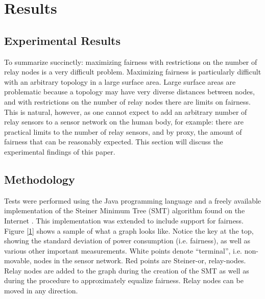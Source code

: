 \section{Results}

\subsection{Experimental Results}

To summarize succinctly: maximizing fairness with restrictions on the number of relay nodes is a very difficult problem.  Maximizing fairness is particularly difficult with an arbitrary topology in a large surface area.  Large surface areas are problematic because a topology may have very diverse distances between nodes, and with restrictions on the number of relay nodes there are limits on fairness.  This is natural, however, as one cannot expect to add an arbitrary number of relay sensors to a sensor network on the human body, for example: there are practical limits to the number of relay sensors, and by proxy, the amount of fairness that can be reasonably expected.  This section will discuss the experimental findings of this paper.

\subsection{Methodology}

Tests were performed using the Java programming language and a freely available implementation of the Steiner Minimum Tree (SMT) algorithm found on the Internet \cite{JAVAAPP}.  This implementation was extended to include support for fairness.   Figure \ref{1} shows a sample of what a graph looks like.  Notice the key at the top, showing the standard deviation of power consumption (i.e. fairness), as well as various other important measurements.  White points denote ``terminal'', i.e. non-movable, nodes in the sensor network.  Red points are Steiner-or, relay-nodes.  Relay nodes are added to the graph during the creation of the SMT as well as during the procedure to approximately equalize fairness.  Relay nodes can be moved in any direction.

